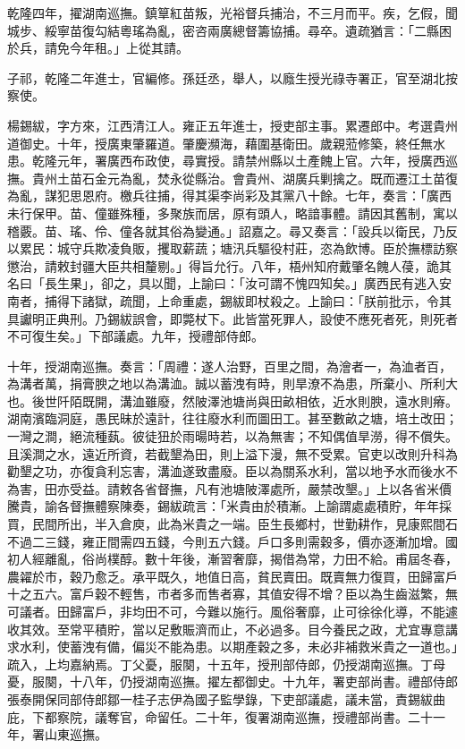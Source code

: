 \begin{pinyinscope}
乾隆四年，擢湖南巡撫。鎮筸紅苗叛，光裕督兵捕治，不三月而平。疾，乞假，聞城步、綏寧苗復勾結粵瑤為亂，密咨兩廣總督籌協捕。尋卒。遺疏猶言：「二縣困於兵，請免今年租。」上從其請。

子祁，乾隆二年進士，官編修。孫廷丞，舉人，以廕生授光祿寺署正，官至湖北按察使。

楊錫紱，字方來，江西清江人。雍正五年進士，授吏部主事。累遷郎中。考選貴州道御史。十年，授廣東肇羅道。肇慶瀕海，藉圍基衛田。歲親蒞修築，終任無水患。乾隆元年，署廣西布政使，尋實授。請禁州縣以土產餽上官。六年，授廣西巡撫。貴州土苗石金元為亂，焚永從縣治。會貴州、湖廣兵剿擒之。既而遷江土苗復為亂，謀犯思恩府。檄兵往捕，得其渠李尚彩及其黨八十餘。七年，奏言：「廣西未行保甲。苗、僮雖殊種，多聚族而居，原有頭人，略諳事體。請因其舊制，寓以稽覈。苗、瑤、伶、僮各就其俗為變通。」詔嘉之。尋又奏言：「設兵以衛民，乃反以累民：城守兵欺凌負販，攫取薪蔬；塘汛兵驅役村莊，恣為飲博。臣於撫標訪察懲治，請敕封疆大臣共相釐剔。」得旨允行。八年，梧州知府戴肇名餽人葠，詭其名曰「長生果」，卻之，具以聞，上諭曰：「汝可謂不愧四知矣。」廣西民有逃入安南者，捕得下諸獄，疏聞，上命重處，錫紱即杖殺之。上諭曰：「朕前批示，令其具讞明正典刑。乃錫紱誤會，即斃杖下。此皆當死罪人，設使不應死者死，則死者不可復生矣。」下部議處。九年，授禮部侍郎。

十年，授湖南巡撫。奏言：「周禮：遂人治野，百里之間，為澮者一，為洫者百，為溝者萬，捐膏腴之地以為溝洫。誠以蓄洩有時，則旱潦不為患，所棄小、所利大也。後世阡陌既開，溝洫雖廢，然陂澤池塘尚與田畝相依，近水則腴，遠水則瘠。湖南濱臨洞庭，愚民昧於遠計，往往廢水利而圖田工。甚至數畝之塘，培土改田；一灣之澗，絕流種蓺。彼徒狃於雨暘時若，以為無害；不知偶值旱澇，得不償失。且溪澗之水，遠近所資，若截墾為田，則上溢下漫，無不受累。官吏以改則升科為勸墾之功，亦復貪利忘害，溝洫遂致盡廢。臣以為關系水利，當以地予水而後水不為害，田亦受益。請敕各省督撫，凡有池塘陂澤處所，嚴禁改墾。」上以各省米價騰貴，諭各督撫體察陳奏，錫紱疏言：「米貴由於積漸。上諭謂處處積貯，年年採買，民間所出，半入倉庾，此為米貴之一端。臣生長鄉村，世勤耕作，見康熙間石不過二三錢，雍正間需四五錢，今則五六錢。戶口多則需穀多，價亦逐漸加增。國初人經離亂，俗尚樸醇。數十年後，漸習奢靡，揭借為常，力田不給。甫屆冬春，農糴於巿，穀乃愈乏。承平既久，地值日高，貧民賣田。既賣無力復買，田歸富戶十之五六。富戶穀不輕售，巿者多而售者寡，其值安得不增？臣以為生齒滋繁，無可議者。田歸富戶，非均田不可，今難以施行。風俗奢靡，止可徐徐化導，不能遽收其效。至常平積貯，當以足敷賑濟而止，不必過多。目今養民之政，尤宜專意講求水利，使蓄洩有備，偏災不能為患。以期產穀之多，未必非補救米貴之一道也。」疏入，上均嘉納焉。丁父憂，服闋，十五年，授刑部侍郎，仍授湖南巡撫。丁母憂，服闋，十八年，仍授湖南巡撫。擢左都御史。十九年，署吏部尚書。禮部侍郎張泰開保同部侍郎鄒一桂子志伊為國子監學錄，下吏部議處，議未當，責錫紱曲庇，下都察院，議奪官，命留任。二十年，復署湖南巡撫，授禮部尚書。二十一年，署山東巡撫。


\end{pinyinscope}
